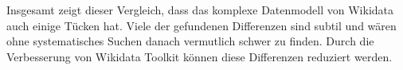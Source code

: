 Insgesamt zeigt dieser Vergleich, dass das komplexe Datenmodell von Wikidata auch einige Tücken hat.
Viele der gefundenen Differenzen sind subtil und wären ohne systematisches Suchen danach vermutlich schwer zu finden.
Durch die Verbesserung von Wikidata Toolkit können diese Differenzen reduziert werden.
% 
% 
% 
% 
% 
% 
